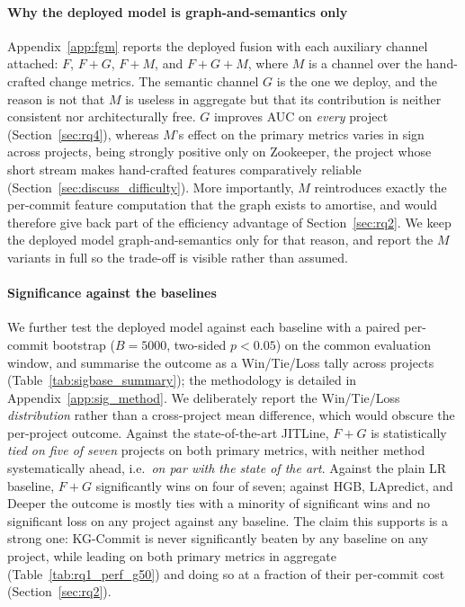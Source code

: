 \documentclass[final,5p,times,twocolumn]{elsarticle}
\theoremstyle{plain}
\begin{document}
\paragraph{Why the deployed model is graph-and-semantics only} Appendix~\ref{app:fgm}
reports the deployed fusion with each auxiliary channel attached: $F$, $F{+}G$,
$F{+}M$, and $F{+}G{+}M$, where $M$ is a channel over the hand-crafted change metrics.
The semantic channel $G$ is the one we deploy, and the reason is not that $M$ is
useless in aggregate but that its contribution is neither consistent nor
architecturally free. $G$ improves AUC on \emph{every} project
(Section~\ref{sec:rq4}), whereas $M$'s effect on the primary metrics varies in sign
across projects, being strongly positive only on Zookeeper, the project whose short
stream makes hand-crafted features comparatively reliable
(Section~\ref{sec:discuss_difficulty}). More importantly, $M$ reintroduces exactly the
per-commit feature computation that the graph exists to amortise, and would therefore
give back part of the efficiency advantage of Section~\ref{sec:rq2}. We keep the
deployed model graph-and-semantics only for that reason, and report the $M$ variants in
full so the trade-off is visible rather than assumed.

\paragraph{Significance against the baselines} We further test the deployed model
against each baseline with a paired per-commit bootstrap ($B{=}5000$, two-sided
$p<0.05$) on the common evaluation window, and summarise the outcome as a Win/Tie/Loss
tally across projects (Table~\ref{tab:sigbase_summary}); the methodology is detailed in
Appendix~\ref{app:sig_method}. We deliberately report the Win/Tie/Loss \emph{distribution}
rather than a cross-project mean difference, which would obscure the per-project outcome.
Against the state-of-the-art JITLine, $F{+}G$ is statistically \emph{tied on five of
seven} projects on both primary metrics, with neither method systematically ahead, i.e.\
\emph{on par with the state of the art}. Against the plain LR baseline, $F{+}G$
significantly wins on four of seven; against HGB, LApredict, and Deeper the outcome is
mostly ties with a minority of significant wins and no significant loss on any
project against any baseline. The claim this supports is a strong one: KG-Commit is
never significantly beaten by any baseline on any project, while leading on both
primary metrics in aggregate (Table~\ref{tab:rq1_perf_g50}) and doing so at a fraction
of their per-commit cost (Section~\ref{sec:rq2}).
\end{document}
